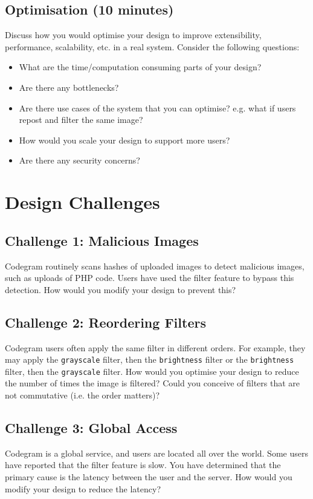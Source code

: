 \documentclass{csse4400}
\begin{document}
\subsection*{Optimisation (10 minutes)}
Discuss how you would optimise your design to improve extensibility, performance, scalability, etc. in a real system.
Consider the following questions:
\begin{itemize}
    \item What are the time/computation consuming parts of your design?
    \item Are there any bottlenecks?
    \item Are there use cases of the system that you can optimise? e.g. what if users repost and filter the same image?
    \item How would you scale your design to support more users?
    \item Are there any security concerns?
\end{itemize}

\section{Design Challenges}

\subsection*{Challenge 1: Malicious Images}
Codegram routinely scans hashes of uploaded images to detect malicious images, such as uploads of PHP code.
Users have used the filter feature to bypass this detection.
How would you modify your design to prevent this?

\subsection*{Challenge 2: Reordering Filters}
Codegram users often apply the same filter in different orders.
For example, they may apply the \texttt{grayscale} filter, then the \texttt{brightness} filter or the \texttt{brightness} filter, then the \texttt{grayscale} filter.
How would you optimise your design to reduce the number of times the image is filtered?
Could you conceive of filters that are not commutative (i.e. the order matters)?

\subsection*{Challenge 3: Global Access}
Codegram is a global service, and users are located all over the world.
Some users have reported that the filter feature is slow.
You have determined that the primary cause is the latency between the user and the server.
How would you modify your design to reduce the latency?
\end{document}
